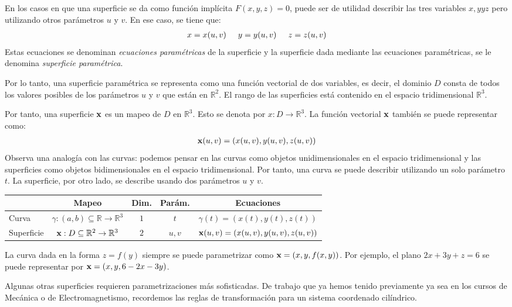 En los casos en que una superficie se da como función implícita $F (x, y, z) = 0$, puede ser de utilidad describir las tres variables $x, y y z$ pero utilizando otros parámetros $u$ y $v$. En ese caso, se tiene que:
\begin{align*}
x = x (u, v) \hspace{0.5cm} y = y (u, v) \hspace{0.5cm} z = z (u, v)
\end{align*}
Estas ecuaciones se denominan \emph{ecuaciones paramétricas} de la superficie y la superficie dada mediante las ecuaciones paramétricas, se le denomina \emph{superficie paramétrica}.
\par
Por lo tanto, una superficie paramétrica se representa como una función vectorial de dos variables, es decir, el dominio $D$ consta de todos los valores posibles de los parámetros $u$ y $v$ que están en $\mathbb{R}^{2}$. El rango de las superficies está contenido en el espacio tridimensional $\mathbb{R}^{3}$.
\par
Por tanto, una superficie $\vb{x}$ es un mapeo de $D$ en $\mathbb{R}^{3}$. Esto se denota por $x: D \to \mathbb{R}^{3}$. La función vectorial $\vb{x}$ también se puede representar como:
\begin{align*}
\vb{x} (u, v) = (x (u, v), y (u, v), z (u, v))
\end{align*}
Observa una analogía con las curvas: podemos pensar en las curvas como objetos unidimensionales en el espacio tridimensional y las superficies como objetos bidimensionales en el espacio tridimensional. Por tanto, una curva se puede describir utilizando un solo parámetro $t$. La superficie, por otro lado, se describe usando dos parámetros $u$ y $v$.
\begin{table}[H]
\centering
\begin{tabular}{|l | c | c | c | c |} \hline
& Mapeo & Dim. & Parám. & Ecuaciones \\ \hline
Curva & $\gamma: (a, b) \subseteq \mathbb{R} \to \mathbb{R}^{3}$ & $1$ & $t$ & $\gamma(t) = (x(t), y(t), z(t))$ \\ \hline
Superficie & $\vb{x}: D \subseteq \mathbb{R}^{2} \to \mathbb{R}^{3}$ & $2$ & $u, v$ & $\vb{x} (u, v) = (x(u, v), y(u, v), z(u, v))$ \\ \hline
\end{tabular}
\end{table}
La curva dada en la forma $z = f(y)$ siempre se puede parametrizar como $\vb{x} = (x, y, f(x, y))$. Por ejemplo, el plano $2 x + 3 y + z = 6$ se puede representar por $\vb{x} = (x, y, 6 - 2 x - 3 y)$.
\par
Algunas otras superficies requieren parametrizaciones más sofisticadas. De trabajo que ya hemos tenido previamente ya sea en los cursos de Mecánica o de Electromagnetismo, recordemos las reglas de transformación para un sistema coordenado cilíndrico.

